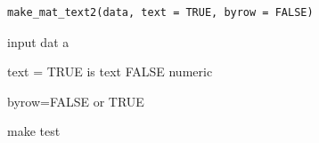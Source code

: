 \documentclass[a4paper]{book}
\begin{document}
%
\begin{Usage}
\begin{verbatim}
make_mat_text2(data, text = TRUE, byrow = FALSE)
\end{verbatim}
\end{Usage}
%
\begin{Arguments}
\begin{ldescription}
\item[\code{data}] input dat a

\item[\code{text}] text = TRUE is text FALSE numeric

\item[\code{byrow}] byrow=FALSE  or TRUE
\end{ldescription}
\end{Arguments}
%
\begin{Value}
make test
\end{Value}
%
\end{document}
